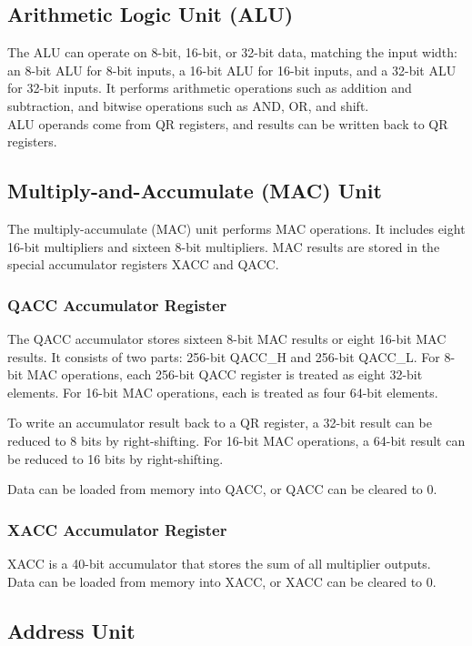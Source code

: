 \documentclass[main\_\_EN.tex]{subfiles}
\begin{document}
\subsection{Arithmetic Logic Unit (ALU)}

The ALU can operate on 8-bit, 16-bit, or 32-bit data, matching the input width: an 8-bit ALU for 8-bit inputs, a 16-bit ALU for 16-bit inputs, and a 32-bit ALU for 32-bit inputs. It performs arithmetic operations such as addition and subtraction, and bitwise operations such as AND, OR, and shift.\\
ALU operands come from QR registers, and results can be written back to QR registers.

\subsection{Multiply-and-Accumulate (MAC) Unit}
The multiply-accumulate (MAC) unit performs MAC operations. It includes eight 16-bit multipliers and sixteen 8-bit multipliers. MAC results are stored in the special accumulator registers XACC and QACC.

\subsubsection{QACC Accumulator Register}

The QACC accumulator stores sixteen 8-bit MAC results or eight 16-bit MAC results. It consists of two parts: 256-bit QACC\_H and 256-bit QACC\_L. For 8-bit MAC operations, each 256-bit QACC register is treated as eight 32-bit elements. For 16-bit MAC operations, each is treated as four 64-bit elements.

To write an accumulator result back to a QR register, a 32-bit result can be reduced to 8 bits by right-shifting. For 16-bit MAC operations, a 64-bit result can be reduced to 16 bits by right-shifting.

Data can be loaded from memory into QACC, or QACC can be cleared to 0.

\subsubsection{XACC Accumulator Register}

XACC is a 40-bit accumulator that stores the sum of all multiplier outputs.\\
Data can be loaded from memory into XACC, or XACC can be cleared to 0.

\subsection{Address Unit}
\end{document}
